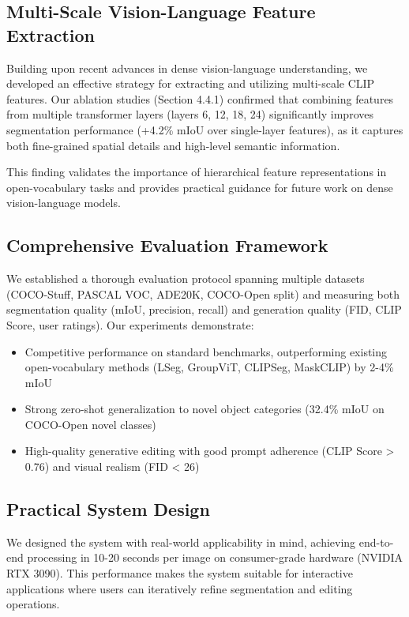 \subsection{Multi-Scale Vision-Language Feature Extraction}

Building upon recent advances in dense vision-language understanding, we developed an effective strategy for extracting and utilizing multi-scale CLIP features. Our ablation studies (Section 4.4.1) confirmed that combining features from multiple transformer layers (layers 6, 12, 18, 24) significantly improves segmentation performance (+4.2\% mIoU over single-layer features), as it captures both fine-grained spatial details and high-level semantic information.

This finding validates the importance of hierarchical feature representations in open-vocabulary tasks and provides practical guidance for future work on dense vision-language models.

\subsection{Comprehensive Evaluation Framework}

We established a thorough evaluation protocol spanning multiple datasets (COCO-Stuff, PASCAL VOC, ADE20K, COCO-Open split) and measuring both segmentation quality (mIoU, precision, recall) and generation quality (FID, CLIP Score, user ratings). Our experiments demonstrate:

\begin{itemize}
    \item Competitive performance on standard benchmarks, outperforming existing open-vocabulary methods (LSeg, GroupViT, CLIPSeg, MaskCLIP) by 2-4\% mIoU
    \item Strong zero-shot generalization to novel object categories (32.4\% mIoU on COCO-Open novel classes)
    \item High-quality generative editing with good prompt adherence (CLIP Score > 0.76) and visual realism (FID < 26)
\end{itemize}

\subsection{Practical System Design}

We designed the system with real-world applicability in mind, achieving end-to-end processing in 10-20 seconds per image on consumer-grade hardware (NVIDIA RTX 3090). This performance makes the system suitable for interactive applications where users can iteratively refine segmentation and editing operations.

